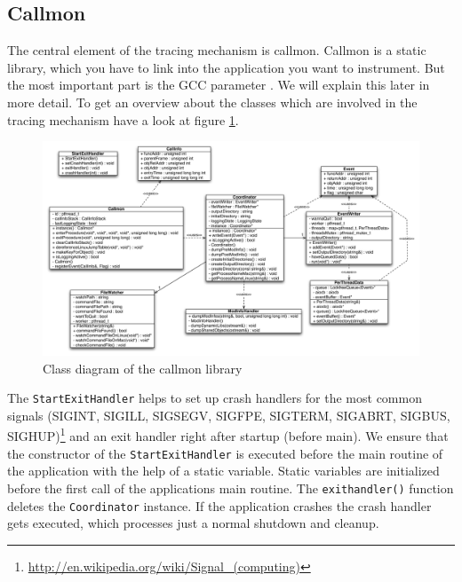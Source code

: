 \subsection{Callmon}

The central element of the tracing mechanism is callmon. Callmon is a static library, which you have to link into the application you want to instrument. But the most important part is the GCC parameter . We will explain this later in more detail. To get an overview about the classes which are involved in the tracing mechanism have a look at figure \ref{fig:UNIXfe_figure1}.

\begin{figure}[ht]
\centering
\includegraphics[width=16cm]{images/callmon_class_diagram}
\caption{Class diagram of the callmon library}\label{fig:UNIXfe_figure1}
\end{figure}

The \verb=StartExitHandler= helps to set up crash handlers for the most common signals (SIGINT, SIGILL, SIGSEGV, SIGFPE, SIGTERM, SIGABRT, SIGBUS, SIGHUP)\footnote{\url{http://en.wikipedia.org/wiki/Signal_(computing)}} and an exit handler right after startup (before main). We ensure that the constructor of the \verb=StartExitHandler= is executed before the main routine of the application with the help of a static variable. Static variables are initialized before the first call of the applications main routine. The \verb=exithandler()= function deletes the \verb=Coordinator= instance. If the application crashes the crash handler gets executed, which processes just a normal shutdown and cleanup.

